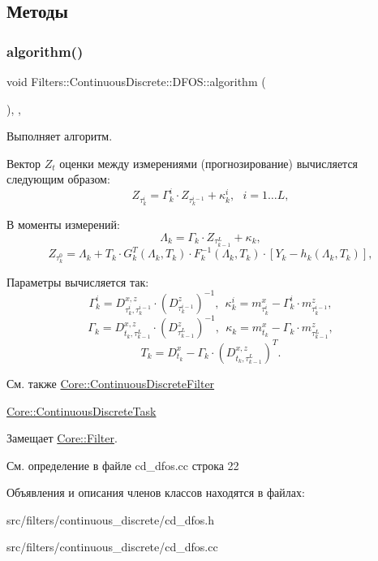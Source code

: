 \subsection{Методы}
\hypertarget{class_filters_1_1_continuous_discrete_1_1_d_f_o_s_a532847e55043544b0ea50fd5744939c1}{}\label{class_filters_1_1_continuous_discrete_1_1_d_f_o_s_a532847e55043544b0ea50fd5744939c1} 
\subsubsection{\texorpdfstring{algorithm()}{algorithm()}}
{\footnotesize\ttfamily void Filters\+::\+Continuous\+Discrete\+::\+D\+F\+O\+S\+::algorithm (\begin{DoxyParamCaption}{ }\end{DoxyParamCaption})\hspace{0.3cm}{\ttfamily [override]}, {\ttfamily [protected]}, {\ttfamily [virtual]}}



Выполняет алгоритм. 

Вектор $Z_t$ оценки между измерениями (прогнозирование) вычисляется следующим образом\+: \[Z_{\tau_k^i} = \Gamma_k^i \cdot Z_{\tau_k^{i-1}} + \kappa_k^i,\ \ \ i = 1 \ldots L,\]

В моменты измерений\+: \[\Lambda_k = \Gamma_k \cdot Z_{\tau_{k-1}^L} + \kappa_k,\] \[Z_{\tau_k^0} = \Lambda_k + T_k \cdot G_k^T(\Lambda_k, T_k) \cdot F_k^{-1}(\Lambda_k, T_k) \cdot [Y_k - h_k(\Lambda_k, T_k)],\]

Параметры вычисляется так\+: \[\Gamma_k^i = D_{\tau_k^i,\tau_k^{i-1}}^{x,z} \cdot (D_{\tau_k^{i-1}}^z)^{-1},\ \ \kappa_k^i = m_{\tau_k^i}^x - \Gamma_k^i \cdot m_{\tau_k^{i-1}}^z,\] \[\Gamma_k = D_{t_k,\tau_{k-1}^L}^{x,z} \cdot (D_{\tau_{k-1}^L}^z)^{-1},\ \ \kappa_k = m_{t_k}^x - \Gamma_k \cdot m_{\tau_{k-1}^L}^z,\] \[T_k = D_{t_k}^x - \Gamma_k \cdot (D_{t_k,\tau_{k-1}^L}^{x,z})^T.\]

\begin{DoxySeeAlso}{См. также}
\hyperlink{class_core_1_1_continuous_discrete_filter}{Core\+::\+Continuous\+Discrete\+Filter} 

\hyperlink{class_core_1_1_continuous_discrete_task}{Core\+::\+Continuous\+Discrete\+Task} 
\end{DoxySeeAlso}


Замещает \hyperlink{class_core_1_1_filter_a438681ee3e54aba2148042d9f8011ab8}{Core\+::\+Filter}.



См. определение в файле cd\+\_\+dfos.\+cc строка 22



Объявления и описания членов классов находятся в файлах\+:\begin{DoxyCompactItemize}
\item 
src/filters/continuous\+\_\+discrete/cd\+\_\+dfos.\+h\item 
src/filters/continuous\+\_\+discrete/cd\+\_\+dfos.\+cc\end{DoxyCompactItemize}
